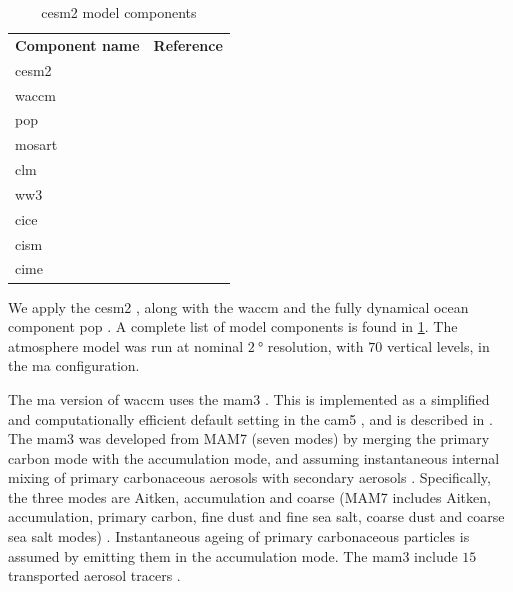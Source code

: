 \documentclass{ametsocV5}
\begin{document}
\begin{table}
  \centering

  \caption{\acl*{cesm2} model components}\label{tab:cesm-components}%
  \begin{center}
    \begin{tabular}[c]{ll}
      \multicolumn{1}{c}{\textbf{Component name}} &
      \multicolumn{1}{c}{\textbf{Reference}}                                              \\
      \acl*{cesm2}                                & \citet{danabasoglu2020}               \\
      \acl*{waccm}                                & \citet{gettleman2019}                 \\
      \acl*{pop}                                  & \citet{smith2010, danabasoglu2020}    \\
      \acl*{mosart}                               & \citet{li2013, danabasoglu2020}       \\
      \acl*{clm}                                  & \citet{lawrence2019, danabasoglu2020} \\
      \acl*{ww3}                                  & \citet{danabasoglu2020}               \\
      \acl*{cice}                                 & \citet{danabasoglu2020}               \\
      \acl*{cism}                                 & \citet{danabasoglu2020}               \\
      \acl*{cime}                                 & \citet{danabasoglu2020}
    \end{tabular}
  \end{center}
\end{table}

We apply the \ac{cesm2} \citep{danabasoglu2020}, along with the \ac{waccm}
\citep{gettleman2019} and the fully dynamical ocean component \ac{pop} \citep{smith2010,
  danabasoglu2020}. A complete list of model components is found in
\cref{tab:cesm-components}. The atmosphere model was run at nominal \(\SI{2}{\degree}\)
resolution, with \(70\) vertical levels, in the \ac{ma} configuration.

The \ac{ma} version of \ac{waccm} uses the \ac{mam3} \citep{gettleman2019}. This is
implemented as a simplified and computationally efficient default setting in the
\ac{cam5} \citep{liu2016}, and is described in \citet{liu2012}. The \ac{mam3} was
developed from MAM7 (seven modes) by merging the primary carbon mode with the
accumulation mode, and assuming instantaneous internal mixing of primary carbonaceous
aerosols with secondary aerosols \citep{liu2016}. Specifically, the three modes are
Aitken, accumulation and coarse (MAM7 includes Aitken, accumulation, primary carbon,
fine dust and fine sea salt, coarse dust and coarse sea salt modes) \citep{liu2016}.
Instantaneous ageing of primary carbonaceous particles is assumed by emitting them in
the accumulation mode. The \ac{mam3} include \(15\) transported aerosol tracers
\citep{liu2016}.
\end{document}
